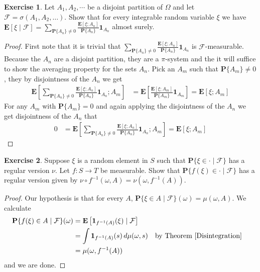 \documentclass{amsbook}
\theoremstyle{definition}
\newtheorem{xca}{Exercise}
\theoremstyle{remark}
\newcommand{\expectation}[1]{\textbf{E}\left[#1\right]}
\newcommand{\cexpectationlong}[2]{\textbf{E}\left[ #2 \mid #1 \right]}
\newcommand{\probability}[1]{\textbf{P}\{#1\}}
\newcommand{\cprobability}[2]{\textbf{P}\{#2 \mid #1\}}
\newcommand{\characteristic}[1]{\textbf{1}_{#1}}
\newcommand{\pushforward}[2]{#2 \circ #1^{-1}}
\begin{document}
\begin{xca}Let $A_1, A_2, \cdots$ be a disjoint partition of $\Omega$
  and let $\mathcal{F} = \sigma(A_1, A_2, \dots)$.  Show that for
  every integrable random variable $\xi$ we have
$\cexpectationlong{\mathcal{F}}{\xi} = \sum_{\probability{A_n} \neq 0}
\frac{\expectation{\xi ; A_n}}{\probability{A_n}} \characteristic{A_n}$ almost surely.
\end{xca}
\begin{proof}First note that it is trivial that $\sum_{\probability{A_n} \neq 0}
\frac{\expectation{\xi ; A_n}}{\probability{A_n}}\characteristic{A_n}$ is
$\mathcal{F}$-measurable.  Because the $A_n$ are a disjoint partition,
  they are a $\pi$-system and the it will suffice to show the
  averaging property for the sets $A_n$.
Pick an $A_m$ such that $\probability{A_m} \neq 0$, they by
disjointness of the $A_n$ we get
\begin{align*}
\expectation{\sum_{\probability{A_n} \neq 0}
\frac{\expectation{\xi ; A_n}}{\probability{A_n}}
\characteristic{A_n}; A_m} &= \expectation{\frac{\expectation{\xi ;
    A_m}}{\probability{A_m}} \characteristic{A_m}} = \expectation{\xi ; A_m}
\end{align*}
For any $A_m$ with $\probability{A_m} = 0$ and again applying the
disjointness of the $A_n$ we get
disjointness of the $A_n$ that 
\begin{align*}
0 &= \expectation{\sum_{\probability{A_n} \neq 0}
\frac{\expectation{\xi ; A_n}}{\probability{A_n}}
\characteristic{A_n}; A_m}  = \expectation{\xi ; A_m}
\end{align*}
\end{proof}

\begin{xca}Suppose $\xi$ is a random element in $S$ such that
  $\cprobability{\mathcal{F}}{\xi \in \cdot}$ has a regular version
  $\nu$.  Let $f : S \to T$ be measurable.  Show that
  $\cprobability{\mathcal{F}}{f(\xi) \in \cdot}$ has a regular version
  given by $\pushforward{f} {\nu} (\omega, A) = \nu(\omega, f^{-1}(A))$.
\end{xca}
\begin{proof}
Our hypothesis is that for every $A$, $\cprobability{\mathcal{F}}{\xi
  \in A}(\omega) = \mu(\omega, A)$.  We calculate 
\begin{align*}
\cprobability{\mathcal{F}}{f(\xi) \in A}(\omega) &=
\cexpectationlong{\mathcal{F}}{\characteristic{f^{-1}(A)}(\xi)} \\
&=\int \characteristic{f^{-1}(A)}(s) \, d\mu(\omega, s) & & \text{by
  Theorem \ref{Disintegration}} \\
&=\mu(\omega, f^{-1}(A))
\end{align*}
and we are done.
\end{proof}
\end{document}
